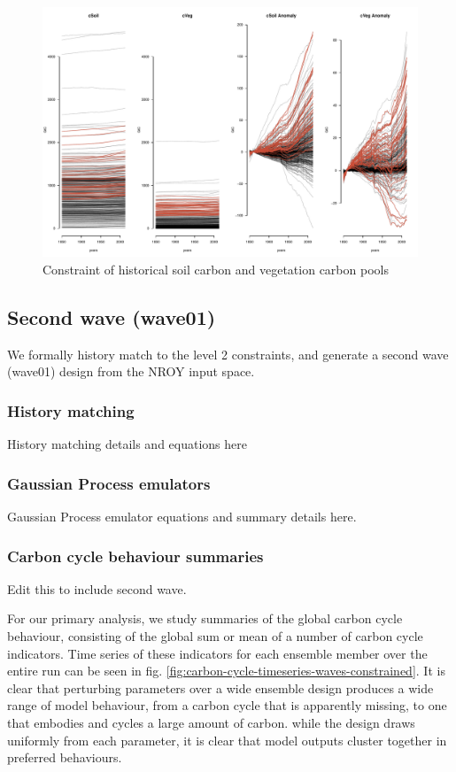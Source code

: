 \documentclass[gmd, manuscript]{copernicus}
\begin{document}
%
\begin{figure}[t]
\includegraphics[width=12cm]{./graphics/vegC-soilC-constrained.pdf}
\caption{Constraint of historical soil carbon and vegetation carbon pools}
\label{fig:vegC-soilC-constrained}
\end{figure}


\subsection{Second wave (wave01)}

We formally history match to the level 2 constraints, and generate a second wave (wave01) design from the NROY input space.

\subsubsection{History matching}

History matching details and equations here

\subsubsection{Gaussian Process emulators} 

Gaussian Process emulator equations and summary details here.

\subsubsection{Carbon cycle behaviour summaries}

Edit this to include second wave.

For our primary analysis, we study summaries of the global carbon cycle behaviour, consisting of the global sum or mean of a number of carbon cycle indicators. Time series of these indicators for each ensemble member over the entire run can be seen in fig. \ref{fig:carbon-cycle-timeseries-waves-constrained}. It is clear that perturbing parameters over a wide ensemble design produces a wide range of model behaviour, from a carbon cycle that is apparently missing, to one that embodies and cycles a large amount of carbon. while the design draws uniformly from each parameter, it is clear that model outputs cluster together in preferred behaviours.
\end{document}
